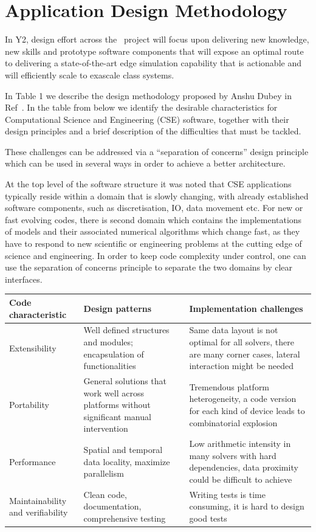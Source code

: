 \documentclass{article}
\begin{document}
\section{Application Design Methodology}

In Y2, design effort across the \nep \   project will focus upon delivering new 
knowledge, new skills and prototype software components that will expose an optimal 
route to delivering a state-of-the-art edge simulation capability that is actionable 
and will efficiently scale to exascale class systems.

In Table 1 we describe the design methodology proposed by Anshu Dubey in Ref~\cite{ref:8}. 
In the table from below we identify the desirable characteristics for Computational 
Science and Engineering (CSE) software, together with their design principles and 
a brief description of the difficulties that must be tackled.

These challenges can be addressed via a ``separation of concerns'' design principle 
which can be used in several ways in order to achieve a better architecture.

At the top level of the software structure it was noted that CSE applications typically 
reside within a domain that is slowly changing, with already established software 
components, such as discretisation, IO, data movement etc. For new or fast evolving 
codes, there is second domain which contains the implementations of models and 
their associated numerical algorithms which change fast, as they have to respond 
to new scientific or engineering problems at the cutting edge of science and engineering. 
In order to keep code complexity under control, one can use the separation of concerns 
principle to separate the two domains by clear interfaces. 

\begin{tabular}{|>{\raggedright}p{49pt}|>{\raggedright}p{115pt}|>{\raggedright}p{115pt}|}
\hline
Code characteristic & Design patterns & Implementation challenges\tabularnewline
\hline
Extensibility & Well defined structures and modules; encapsulation of functionalities & Same 
data layout is not optimal for all solvers, there are many corner cases, lateral 
interaction might be needed\tabularnewline
\hline
Portability & General solutions that work well across platforms without significant 
manual intervention & Tremendous platform heterogeneity, a code version for each 
kind of device leads to combinatorial explosion\tabularnewline
\hline
Performance & Spatial and temporal data locality, maximize parallelism & Low arithmetic 
intensity in many solvers with hard dependencies, data proximity could be difficult 
to achieve \tabularnewline
\hline
Maintainability and verifiability & Clean code, documentation, comprehensive testing & Writing 
tests is time consuming, it is hard to design good tests\tabularnewline
\hline
\end{tabular}
\end{document}
